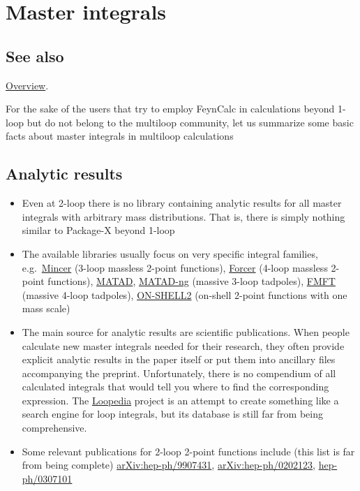 \documentclass[../FeynCalcManual.tex]{subfiles}
\begin{document}
\hypertarget{master integrals}{
\section{Master integrals}\label{master integrals}}

\subsection{See also}

\hyperlink{toc}{Overview}.

For the sake of the users that try to employ FeynCalc in calculations
beyond 1-loop but do not belong to the multiloop community, let us
summarize some basic facts about master integrals in multiloop
calculations

\hypertarget{analytic-results}{%
\subsection{Analytic results}\label{analytic-results}}

\begin{itemize}
\item
  Even at 2-loop there is no library containing analytic results for all
  master integrals with arbitrary mass distributions. That is, there is
  simply nothing similar to Package-X beyond 1-loop
\item
  The available libraries usually focus on very specific integral
  families,
  e.g.~\href{https://www.nikhef.nl/~form/maindir/packages/mincer/mincer.html}{Mincer}
  (3-loop massless 2-point functions),
  \href{https://github.com/benruijl/forcer}{Forcer} (4-loop massless
  2-point functions),
  \href{https://www.ttp.kit.edu/~ms/software.html}{MATAD},
  \href{https://github.com/apik/matad-ng}{MATAD-ng} (massive 3-loop
  tadpoles), \href{https://github.com/apik/fmft}{FMFT} (massive 4-loop
  tadpoles),
  \href{http://theor.jinr.ru/~kalmykov/onshell2/onshell2.html}{ON-SHELL2}
  (on-shell 2-point functions with one mass scale)
\item
  The main source for analytic results are scientific publications. When
  people calculate new master integrals needed for their research, they
  often provide explicit analytic results in the paper itself or put
  them into ancillary files accompanying the preprint. Unfortunately,
  there is no compendium of all calculated integrals that would tell you
  where to find the corresponding expression. The
  \href{https://arxiv.org/abs/1709.01266}{Loopedia} project is an
  attempt to create something like a search engine for loop integrals,
  but its database is still far from being comprehensive.
\item
  Some relevant publications for 2-loop 2-point functions include (this
  list is far from being complete)
  \href{https://arxiv.org/abs/hep-ph/9907431}{arXiv:hep-ph/9907431},
  \href{https://arxiv.org/abs/hep-ph/0202123v2}{arXiv:hep-ph/0202123},
  \href{https://arxiv.org/abs/hep-ph/0307101v1}{hep-ph/0307101}
\end{itemize}
\end{document}
